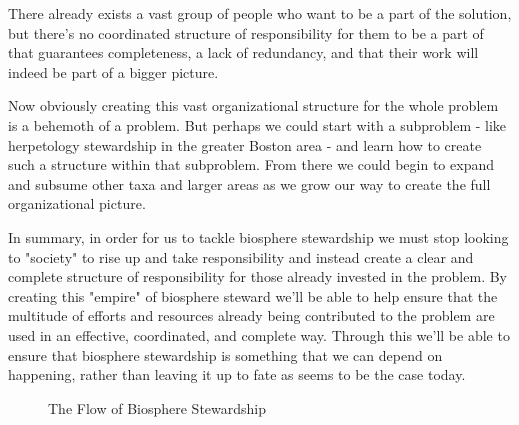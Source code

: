 \documentclass[10pt,a5paper]{book}
\begin{document}
	There already exists a vast group of people who want to be a part of the solution, but there's no coordinated structure of responsibility for them to be a part of that guarantees completeness, a lack of redundancy, and that their work will indeed be part of a bigger picture. 

Now obviously creating this vast organizational structure for the whole problem is a behemoth of a problem. But perhaps we could start with a subproblem - like herpetology stewardship in the greater Boston area - and learn how to create such a structure within that subproblem. From there we could begin to expand and subsume other taxa and larger areas as we grow our way to create the full organizational picture. 

In summary, in order for us to tackle biosphere stewardship we must stop looking to "society" to rise up and take responsibility and instead create a clear and complete structure of responsibility for those already invested in the problem. By creating this "empire" of biosphere steward we'll be able to help ensure that the multitude of efforts and resources already being contributed to the problem are used in an effective, coordinated, and complete way. Through this we'll be able to ensure that biosphere stewardship is something that we can depend on happening, rather than leaving it up to fate as seems to be the case today. 


\begin{figure}[!htb]
\caption{\label{fig:my-label} The Flow of Biosphere Stewardship}
\end{figure}
\end{document}
